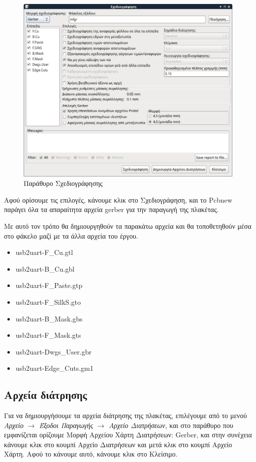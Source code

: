 \documentclass[a4paper]{article}
\begin{document}
\begin{figure}
  \begin{center}
    \includegraphics[width=.9\textwidth]{img/pcb-dial-plot.png}
    \caption{Παράθυρο Σχεδιογράφησης}
    \label{fig:pcb-dial-plot}
  \end{center}
\end{figure}

Αφού ορίσουμε τις επιλογές, κάνουμε κλικ στο Σχεδιογράφηση, και το Pcbnew παράγει όλα τα απαραίτητα αρχεία gerber για την παραγωγή της πλακέτας.

Με αυτό τον τρόπο θα δημιουργηθούν τα παρακάτω αρχεία και θα τοποθετηθούν μέσα στο φάκελο μαζί με τα άλλα αρχεία του έργου.

\begin{itemize}
    \item usb2uart-F\_Cu.gtl
    \item usb2uart-B\_Cu.gbl
    \item usb2uart-F\_Paste.gtp
    \item usb2uart-F\_SilkS.gto
    \item usb2uart-B\_Mask.gbs
    \item usb2uart-F\_Mask.gts
    \item usb2uart-Dwgs\_User.gbr
    \item usb2uart-Edge\_Cuts.gm1
\end{itemize}

\subsection{Αρχεία διάτρησης}
Για να δημιουργήσουμε τα αρχεία διάτρησης της πλακέτας, επιλέγουμε από το μενού \textit{Αρχείο $\rightarrow$ Έξοδοι Παραγωγής $\rightarrow$ Αρχείο Διατρήσεων}, και στο παράθυρο που εμφανίζεται ορίζουμε Μορφή Αρχείου Χάρτη Διατρήσεων: Gerber, και στην συνέχεια κάνουμε κλικ στο κουμπί Αρχείο Διατρήσεων και μετά κλικ στο κουμπί Αρχείο Χάρτη. Αφού το κάνουμε αυτό, κάνουμε κλικ στο Κλείσιμο.
\end{document}
